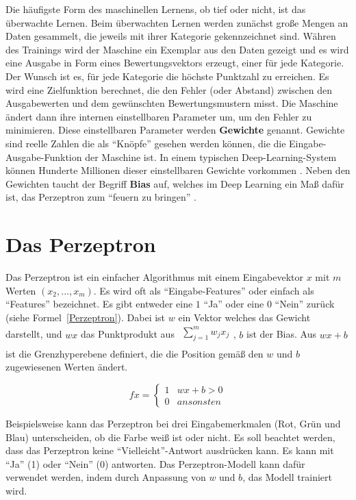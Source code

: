 Die häufigste Form des maschinellen Lernens, ob tief oder nicht, ist das überwachte Lernen. Beim überwachten Lernen werden zunächst große Mengen an Daten gesammelt, die jeweils mit ihrer Kategorie gekennzeichnet sind. Währen des Trainings wird der Maschine ein Exemplar aus den Daten gezeigt und es wird eine Ausgabe in Form eines Bewertungsvektors erzeugt, einer für jede Kategorie. Der Wunsch ist es, für jede Kategorie die höchste Punktzahl zu erreichen. Es wird eine Zielfunktion berechnet, die den Fehler (oder Abstand) zwischen den Ausgabewerten und dem gewünschten Bewertungsmustern misst. Die Maschine ändert dann ihre internen einstellbaren Parameter um, um den Fehler zu minimieren. Diese einstellbaren Parameter werden \textbf{Gewichte} genannt. Gewichte sind reelle Zahlen die als \enquote{Knöpfe} gesehen werden können, die die Eingabe-Ausgabe-Funktion der Maschine ist. In einem typischen Deep-Learning-System können Hunderte Millionen dieser einstellbaren Gewichte vorkommen \cite*{Lecun2015}. Neben den Gewichten taucht der Begriff \textbf{Bias} auf, welches im Deep Learning ein Maß dafür ist, das Perzeptron zum \enquote{feuern zu bringen} \cite*[7]{Nielsen2015}.


\section{Das Perzeptron}
Das Perzeptron ist ein einfacher Algorithmus mit einem Eingabevektor $x$ mit $m$ Werten $(x_2, ..., x_m)$. Es wird oft als \enquote{Eingabe-Features} oder einfach als \enquote{Features} bezeichnet. Es gibt entweder eine $1$ \enquote{Ja} oder eine $0$ \enquote{Nein} zurück (siehe Formel~\ref{Perzeptron}). Dabei ist $w$ ein Vektor welches das Gewicht darstellt, und $wx$ das Punktprodukt aus $\begin{array}{l}
        {\textstyle \sum ^{m}_{j=1}} w_{j} x_{j} \\
    \end{array}$, $b$ ist der Bias. Aus $wx + b$ ist die Grenzhyperebene definiert, die die Position gemäß den $w$ und $b$ zugewiesenen Werten ändert.

\begin{equation}\label{Perzeptron}
    fx=\begin{cases}
        1 & wx+b >0   \\
        0 & ansonsten
    \end{cases}
\end{equation}

Beispielsweise kann das Perzeptron bei drei Eingabemerkmalen  (Rot, Grün und Blau) unterscheiden, ob die Farbe weiß ist oder nicht. Es soll beachtet werden, dass das Perzeptron keine \enquote{Vielleicht}-Antwort ausdrücken kann. Es kann mit \enquote{Ja} (1) oder \enquote{Nein} (0) antworten. Das Perzeptron-Modell kann dafür verwendet werden, indem durch Anpassung von $w$ und $b$, das Modell trainiert wird.



